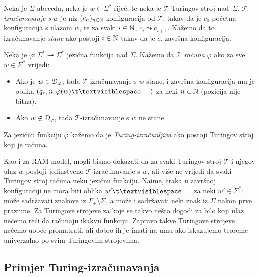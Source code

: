 \begin{definicija}
Neka je $\Sigma$ abeceda, neka je $w\in\Sigma^*$ riječ, te neka je $\mathcal T$ Turingov stroj nad~$\Sigma$. \emph{$\mathcal T$-izračunavanje s $w$} je niz $(c_n)_{n\in{\mathbb N}}$ konfiguracija od $\mathcal T$, takav da je $c_0$ početna konfiguracija s ulazom $w$, te za svaki $i\in{\mathbb N}$, $c_i\leadsto c_{i+1}$. Kažemo da to izračunavanje \emph{stane} ako postoji $i\in{\mathbb N}$ takav da je $c_i$ završna konfiguracija.

Neka je $\varphi\colon\Sigma^*\rightharpoonup\Sigma^*$ jezična funkcija nad $\Sigma$. Kažemo da $\mathcal T$ \emph{računa} $\varphi$ ako za sve $w\in\Sigma^*$ vrijedi:
\begin{itemize}
    \item Ako je $w\in\mathcal D_{\varphi}$, tada $\mathcal T$-izračunavanje s $w$ stane, i završna konfiguracija mu je oblika $(q_z,n,\varphi(w)\bl\ldots)$ za neki $n\in{\mathbb N}$ (pozicija nije bitna).
    \item Ako $w\not\in\mathcal D_{\varphi}$, tada $\mathcal T$-izračunavanje s $w$ ne stane.
\end{itemize}
Za jezičnu funkciju $\varphi$ kažemo da je \emph{Turing-izračunljiva} ako postoji Turingov stroj koji je računa.
\end{definicija}

Kao i za RAM-model, mogli bismo dokazati da za svaki Turingov stroj $\mathcal T$ i njegov ulaz $w$ postoji jedinstveno $\mathcal T$-izračunavanje s $w$, ali više ne vrijedi da svaki Turingov stroj računa neku jezičnu funkciju. Naime, traka u završnoj konfiguraciji ne mora biti oblika $w'\bl\ldots$ za neki $w'\in\Sigma^*$: može sadržavati znakove iz $\Gamma_+\!\setminus\Sigma$, a može i sadržavati neki znak iz $\Sigma$ nakon prve praznine. Za Turingove strojeve za koje se takvo nešto dogodi za bilo koji ulaz, nećemo reći da računaju ikakvu funkciju. Zapravo takve Turingove strojeve nećemo uopće promatrati, ali dobro ih je imati na umu ako iskazujemo teoreme univerzalno po svim Turingovim strojevima.

\subsection{Primjer Turing-izračunavanja}

